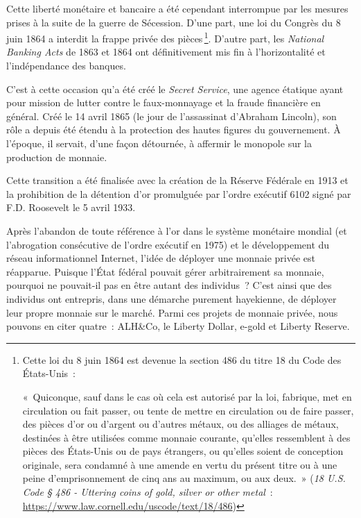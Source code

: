 \documentclass[a4paper,notitlepage]{article}
\renewenvironment{quote}{\small\list{}{\topsep=0.5\baselineskip}\item\relax}{\endlist} %
\newcommand{\eng}[1]{{\NoAutoSpaceBeforeFDP\emph{#1}}}  %
\newcommand{\sfootnote}{\,\footnote}
\begin{document}
Cette liberté monétaire et bancaire a été cependant interrompue par les mesures prises à la suite de la guerre de Sécession. D'une part, une loi du Congrès du 8 juin 1864 a interdit la frappe privée des pièces\sfootnote{Cette loi du 8 juin 1864 est devenue la section 486 du titre 18 du Code des États-Unis~:
\begin{quote}
\footnotesize «~Quiconque, sauf dans le cas où cela est autorisé par la loi, fabrique, met en circulation ou fait passer, ou tente de mettre en circulation ou de faire passer, des pièces d'or ou d'argent ou d'autres métaux, ou des alliages de métaux, destinées à être utilisées comme monnaie courante, qu'elles ressemblent à des pièces des États-Unis ou de pays étrangers, ou qu'elles soient de conception originale, sera condamné à une amende en vertu du présent titre ou à une peine d'emprisonnement de cinq ans au maximum, ou aux deux.~»
\end{quote} %
(\eng{18 U.S. Code § 486 - Uttering coins of gold, silver or other metal}~: \url{https://www.law.cornell.edu/uscode/text/18/486})}. D'autre part, les \eng{National Banking Acts} de 1863 et 1864 ont définitivement mis fin à l'horizontalité et l'indépendance des banques.

C'est à cette occasion qu'a été créé le \eng{Secret Service}, une agence étatique ayant pour mission de lutter contre le faux-monnayage et la fraude financière en général. Créé le 14 avril 1865 (le jour de l'assassinat d'Abraham Lincoln), son rôle a depuis été étendu à la protection des hautes figures du gouvernement. À l'époque, il servait, d'une façon détournée, à affermir le monopole sur la production de monnaie.

Cette transition a été finalisée avec la création de la Réserve Fédérale en 1913 et la prohibition de la détention d'or promulguée par l'ordre exécutif 6102 signé par F.D. Roosevelt le 5 avril 1933.

Après l'abandon de toute référence à l'or dans le système monétaire mondial (et l'abrogation consécutive de l'ordre exécutif en 1975) et le développement du réseau informationnel Internet, l'idée de déployer une monnaie privée est réapparue. Puisque l'État fédéral pouvait gérer arbitrairement sa monnaie, pourquoi ne pouvait-il pas en être autant des individus~? C'est ainsi que des individus ont entrepris, dans une démarche purement hayekienne, de déployer leur propre monnaie sur le marché. Parmi ces projets de monnaie privée, nous pouvons en citer quatre~: ALH\&Co, le Liberty Dollar, e-gold et Liberty Reserve.
\end{document}
